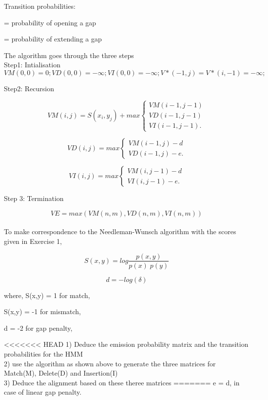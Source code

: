 \documentclass[a4paper,11pt]{article}
\DeclareRobustCommand{\greektext}{%
  \fontencoding{LGR}\selectfont\def\encodingdefault{LGR}}
\DeclareRobustCommand{\textgreek}[1]{\leavevmode{\greektext #1}}
\begin{document}
\vspace{0.5cm}

Transition probabilities:

\textgreek{d} = probability of opening a gap

\textgreek{e} = probability of extending a gap


The algorithm goes through the three steps\\


Step1: Intialisation
\[
VM(0,0)=0; VD(0,0)=-\infty ; VI(0,0)=-\infty;
V*(-1,j)=V*(i,-1)=-\infty;\]
\newpage


Step2: Recursion

\[ VM(i,j) =S(x_{i},y_{j})+max \left\{ \begin{array}{ll}
	 VM(i-1,j-1)\\
         VD(i-1,j-1) \\
         VI(i-1,j-1)  .\end{array} \right. \] 

\[ VD(i,j) =max \left\{ \begin{array}{ll}
         VM(i-1,j)-d \\
         VD(i-1,j)-e  .\end{array} \right. \] 

\[ VI(i,j) =max \left\{ \begin{array}{ll}
         VM(i,j-1)-d \\
         VI(i,j-1)-e  .\end{array} \right. \]  



Step 3: Termination

\[ VE=max(VM(n,m),VD(n,m),VI(n,m))\]\\

To make correspondence to the Needleman-Wunsch algorithm with the scores given in Exercise 1,

\[
S(x,y)=log\frac{p(x,y)}{p(x)\; p(y)}\]

\[
d=-log(\delta)\]

where, S(x,y) = 1 for match, 

S(x,y) = -1 for mismatch,

d = -2 for gap penalty,

<<<<<<< HEAD
1) Deduce the emission probability matrix and the transition probabilities for the HMM \\
2) use the algorithm as shown above to generate the three matrices for Match(M), Delete(D) and Insertion(I)\\
3) Deduce the alignment based on these theree matrices
=======
e = d, in case of linear gap penalty.\\
\end{document}
